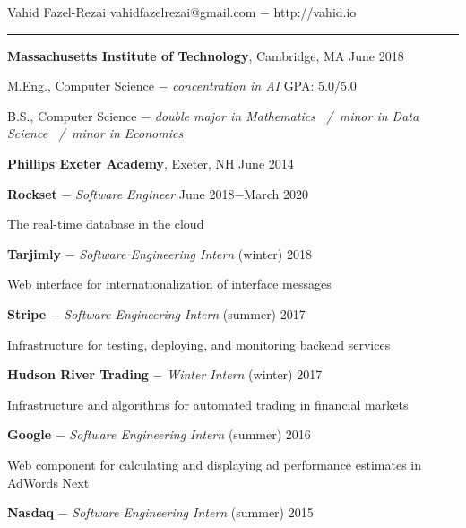 \documentclass[11pt]{article}
\newcommand{\msection}[1]{\vspace{1em}\marginnote{#1}} %
\newcommand{\bt}[1]{\textbf{#1}} %
\newcommand{\gap}[0]{\vspace{0.8em}} %
\newcommand{\dash}[0]{ $-$ } %
\newcommand{\tabsep}[0]{\, / \,} %
\begin{document}

{\Huge Vahid Fazel-Rezai} \hfill  vahidfazelrezai@gmail.com\dash http://vahid.io

\vspace{0.4em}

\hspace{-1.2in}\rule{7.9in}{0.2em}

\vspace{-0.2em}



\msection{Education}

\bt{Massachusetts Institute of Technology}, Cambridge, MA \hfill June 2018

M.Eng., Computer Science \dash \emph{concentration in AI} \hfill GPA: 5.0/5.0

B.S., Computer Science \dash \emph{double major in Mathematics \tabsep minor in Data Science \tabsep minor in Economics}

\gap

\bt{Phillips Exeter Academy}, Exeter, NH \hfill June 2014



\msection{Work}

\bt{Rockset}\dash \emph{Software Engineer} \hfill June 2018$-$March 2020

The real-time database in the cloud

\gap

\bt{Tarjimly}\dash \emph{Software Engineering Intern} \hfill (winter) 2018

Web interface for internationalization of interface messages

\gap

\bt{Stripe}\dash \emph{Software Engineering Intern} \hfill (summer) 2017

Infrastructure for testing, deploying, and monitoring backend services

\gap

\bt{Hudson River Trading}\dash \emph{Winter Intern} \hfill (winter) 2017

Infrastructure and algorithms for automated trading in financial markets

\gap

\bt{Google}\dash \emph{Software Engineering Intern} \hfill (summer) 2016

Web component for calculating and displaying ad performance estimates in AdWords Next

\gap

\bt{Nasdaq}\dash \emph{Software Engineering Intern} \hfill (summer) 2015
\end{document}
